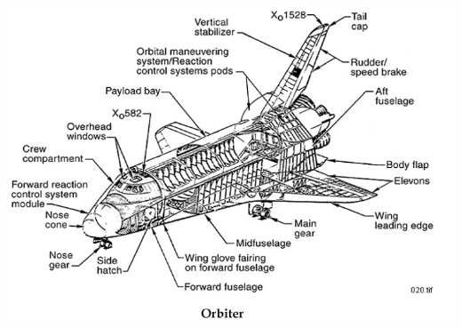 \documentclass[13pt, letter,final]{article}
\begin{document}
\includegraphics[width=1\textwidth]{Orbiter.jpg}
\end{document}
